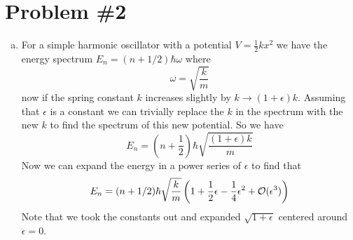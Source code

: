 \documentclass[11pt]{article}
\numberwithin{equation}{section}
\begin{document}
\section{Problem \#2}
\begin{enumerate}[(a)]
\item
For a simple harmonic oscillator with a potential $V = \frac{1}{2}kx^2$ we have the energy spectrum $E_n = (n+1/2)\hbar\omega$ where
$$\omega = \sqrt{\frac{k}{m}}$$
now if the spring constant $k$ increases slightly by $k\rightarrow(1+\epsilon)k$. Assuming that $\epsilon$ is a constant we can trivially replace the $k$ in the spectrum with the new $k$ to find the spectrum of this new potential. So we have
$$E_n = \left(n+\frac{1}{2}\right)\hbar\sqrt{\frac{(1+\epsilon)k}{m}}$$
Now we can expand the energy in a power series of $\epsilon$ to find that
$$E_n = (n+1/2)\hbar\sqrt{\frac{k}{m}}\left(1+\frac{1}{2}\epsilon-\frac{1}{4}\epsilon^2 + \mathcal{O}(\epsilon^3)\right)$$
Note that we took the constants out and expanded $\sqrt{1+\epsilon}$ centered around $\epsilon=0$.


\end{enumerate}
\end{document}

